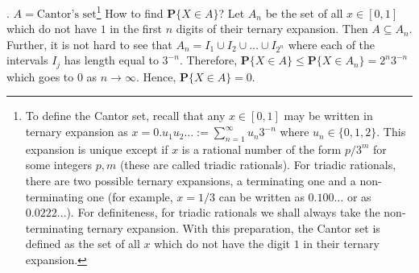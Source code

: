 \documentclass[preprint,  11pt]{amsart}
\newcommand{\parag}[1]{\vspace{4mm}\noindent{\bfseries #1}}
\theoremstyle{plain} %
\theoremstyle{definition} %
\begin{document}
{\parag{2}. $A=\mbox{Cantor's set}$\footnote{To define the Cantor set, recall that any  $x\in [0,1]$ may be written in ternary expansion as $x=0.u_{1}u_{2}\ldots :=\sum_{n=1}^{\infty}u_{n}3^{-n}$ where $u_{n}\in \{0,1,2\}$. This expansion is unique except if $x$ is a rational number of the form $p/3^{m}$ for some integers $p,m$ (these are called triadic rationals). For triadic rationals, there are two possible ternary expansions, a terminating one and a non-terminating one (for example, $x=1/3$ can be written as $0.100\ldots$ or as $0.0222\ldots$). For definiteness, for triadic rationals we shall always take the non-terminating ternary expansion. With this preparation, the Cantor set is defined as the set of all $x$ which do not have the digit $1$ in their ternary expansion.} How to find $\mathbf{P}\{X\in A\}$? Let $A_{n}$ be the set of all $x\in [0,1]$ which do not have $1$ in the first $n$ digits of their ternary expansion. Then $A\subseteq A_{n}$. Further, it is not hard to see that $A_{n}=I_{1}\cup I_{2}\cup \ldots \cup I_{2^{n}}$ where each of the intervals $I_{j}$ has length equal to $3^{-n}$. Therefore, $\mathbf{P}\{X\in A\}\le \mathbf{P}\{X\in A_{n}\}= 2^{n}3^{-n}$ which goes to $0$ as $n\rightarrow \infty$. Hence, $\mathbf{P}\{X\in A\}=0$.
}
\end{document}
